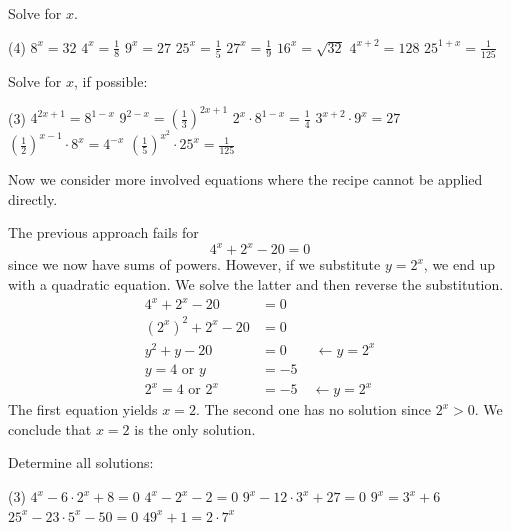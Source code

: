 \begin{exercise}
	Solve for $x$.
	\begin{tasks}(4)
		\task $8^x=32$
		\task $4^x=\frac{1}{8}$
		\task $9^x=27$
		\task $25^x=\frac{1}{5}$
		\task $27^x=\frac{1}{9}$
		\task $16^x=\sqrt{32}$
		\task $4^{x+2}=128$
		\task $25^{1+x}=\frac{1}{125}$
	\end{tasks}
\end{exercise}
\begin{exercise}
	Solve for $x$, if possible:
	\begin{tasks}(3)
		\task $4^{2x+1}=8^{1-x}$
		\task $9^{2-x}=\left(\frac{1}{3}\right)^{2x+1}$
		\task $2^x\cdot 8^{1-x}=\frac{1}{4}$
		\task $3^{x+2}\cdot 9^x=27$
		\task $\left(\frac{1}{2}\right)^{x-1}\cdot 8^x=4^{-x}$
		\task $\left(\frac{1}{5}\right)^{x^2}\cdot 25^x=\frac{1}{125}$
	\end{tasks}
\end{exercise}
Now we consider more involved equations where the recipe cannot be applied directly.
\begin{exampleenv}
\begin{example}
	The previous approach fails for
	\begin{equation*}
		4^x+2^x-20=0
	\end{equation*}
	since we now have sums of powers. However, if we substitute $y=2^x$, we end up with a quadratic equation. We solve the latter and then reverse the substitution.
	\begin{align*}
		4^x+2^x-20&=0\\
		\left(2^x\right)^2+2^x-20&=0\\
		y^2+y-20&=0\quad\quad\leftarrow y=2^x\\
		y=4\text{ or }y&=-5\\
		2^x=4\text{ or }2^x&=-5\quad\leftarrow y=2^x
	\end{align*}
	The first equation yields $x=2$. The second one has no solution since $2^x>0$.
	We conclude that $x=2$ is the only solution.
\end{example}
\end{exampleenv}
\begin{exercise}
	Determine all solutions:
	\begin{tasks}(3)
		\task $4^x-6\cdot 2^x+8=0$
		\task $4^x-2^x-2=0$
		\task $9^x-12\cdot 3^x+27=0$
		\task $9^x=3^x+6$
		\task $25^x-23\cdot 5^x-50=0$
		\task $49^x+1=2\cdot 7^x$
	\end{tasks}
\end{exercise}
